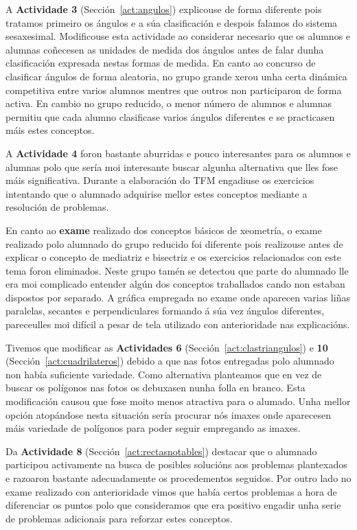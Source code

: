 A \textbf{Actividade 3} (Sección~\ref{act:angulos}) explicouse de forma diferente pois tratamos primeiro os ángulos e a súa clasificación e despois falamos do sistema sesaxesimal. Modificouse esta actividade ao considerar necesario que os alumnos e alumnas coñecesen as unidades de medida dos ángulos antes de falar dunha clasificación expresada nestas formas de medida. En canto ao concurso de clasificar ángulos de forma aleatoria, no grupo grande xerou unha certa dinámica competitiva entre varios alumnos mentres que outros non participaron de forma activa. En cambio no grupo reducido, o menor número de alumnos e alumnas permitiu que cada alumno clasificase varios ángulos diferentes e se practicasen máis estes conceptos.

A \textbf{Actividade 4} foron bastante aburridas e pouco interesantes para os alumnos e alumnas polo que sería moi interesante buscar algunha alternativa que lles fose máis significativa. Durante a elaboración do TFM engadiuse os exercicios intentando que o alumnado adquirise mellor estes conceptos mediante a resolución de problemas.

En canto ao \textbf{exame} realizado dos conceptos básicos de xeometría, o exame realizado polo alumnado do grupo reducido foi diferente pois realizouse antes de explicar o concepto de mediatriz e bisectriz e os exercicios relacionados con este tema foron eliminados. Neste grupo tamén se detectou que parte do alumnado lle era moi complicado entender algún dos conceptos traballados cando non estaban dispostos por separado. A gráfica empregada no exame onde aparecen varias liñas paralelas, secantes e perpendiculares formando á súa vez ángulos diferentes, pareceulles moi difícil a pesar de tela utilizado con anterioridade nas explicacións.

Tivemos que modificar as \textbf{Actividades 6} (Sección~\ref{act:clastriangulos}) e \textbf{10} (Sección~\ref{act:cuadrilateros}) debido a que nas fotos entregadas polo alumnado non había suficiente variedade. Como alternativa planteamos que en vez de buscar os polígonos nas fotos os debuxasen nunha folla en branco. Esta modificación causou que fose moito menos atractiva para o alumado. Unha mellor opción atopándose nesta situación sería procurar nós imaxes onde aparecesen máis variedade de polígonos para poder seguir empregando as imaxes.

Da \textbf{Actividade 8} (Sección~\ref{act:rectasnotables}) destacar que o alumnado participou activamente na busca de posibles solucións aos problemas plantexados e razoaron bastante adecuadamente os procedementos seguidos. Por outro lado no exame realizado con anterioridade vimos que había certos problemas a hora de diferenciar os puntos polo que consideramos que era positivo engadir unha serie de problemas adicionais para reforzar estes conceptos.

